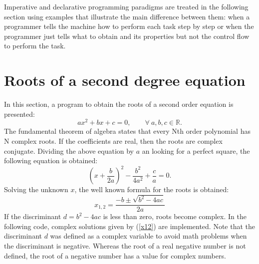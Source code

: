 Imperative and declarative programming paradigms are treated in the following section using examples that illustrate the main difference between them: when a programmer tells the machine how to perform each task step by step or when the programmer just tells what to obtain and its properties but not the control flow to perform the task. 




\newpage 
\section{Roots of a second degree equation} 
In this section, a program to obtain the roots of a second order equation is presented:  
$$
a x^2 + b x + c = 0, \qquad \forall \ a, b, c \in \mathbb{R}.
$$
The fundamental theorem of algebra states that every  Nth order polynomial has N complex roots. 
If the coefficients are real, then the roots are complex conjugate.
Dividing the above equation by $ a $ an looking for a perfect square, 
the following equation is obtained: 
$$
\left( x + \frac{b}{2a} \right)^2 - \frac{b^2 }{ 4 a^2} + \frac{c}{a} = 0. 
$$
Solving the unknown $x$, the well known formula for the roots is obtained: 
\begin{equation}
 x_{1,2} = \frac{ - b \pm \sqrt{ b^2 - 4 a c }  }{ 2 a  }  
 \label{x12}
\end{equation} 
If the discriminant $ d = b^2 - 4 a c $ is less than zero, roots become complex. 
In the following code, complex solutions given by (\ref{x12}) are implemented. 
Note that the discriminant $ d $ was defined as a complex variable to avoid math problems 
when the discriminant is negative. Whereas the root of a real negative number is not defined,
the root of a negative number has a value for complex numbers. 
 
\vspace{0.5cm}











